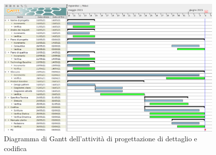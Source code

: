 \begin{figure}[!ht]
    \caption{Diagramma di Gantt dell'attività di progettazione di dettaglio e codifica}
    \vspace{5px}
    \includegraphics[scale=0.22]{../../../Images/Diagrammi/Gantt/progettazioneCodifica_v2.png}
    \centering
\end{figure}

